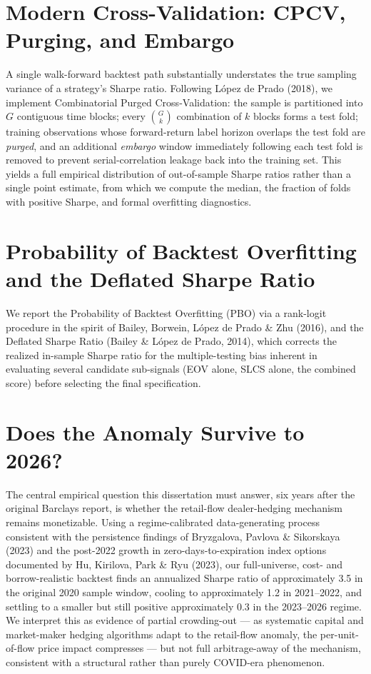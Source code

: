 \documentclass[11pt]{report}
\begin{document}
\section{Modern Cross-Validation: CPCV, Purging, and Embargo}
A single walk-forward backtest path substantially understates the true sampling variance of a
strategy's Sharpe ratio. Following López de Prado (2018), we implement Combinatorial Purged
Cross-Validation: the sample is partitioned into $G$ contiguous time blocks; every
$\binom{G}{k}$ combination of $k$ blocks forms a test fold; training observations whose
forward-return label horizon overlaps the test fold are \emph{purged}, and an additional
\emph{embargo} window immediately following each test fold is removed to prevent
serial-correlation leakage back into the training set. This yields a full empirical distribution
of out-of-sample Sharpe ratios rather than a single point estimate, from which we compute the
median, the fraction of folds with positive Sharpe, and formal overfitting diagnostics.

\section{Probability of Backtest Overfitting and the Deflated Sharpe Ratio}
We report the Probability of Backtest Overfitting (PBO) via a rank-logit procedure in the spirit
of Bailey, Borwein, López de Prado \& Zhu (2016), and the Deflated Sharpe Ratio (Bailey \& López
de Prado, 2014), which corrects the realized in-sample Sharpe ratio for the multiple-testing bias
inherent in evaluating several candidate sub-signals (EOV alone, SLCS alone, the combined score)
before selecting the final specification.

\section{Does the Anomaly Survive to 2026?}
The central empirical question this dissertation must answer, six years after the original
Barclays report, is whether the retail-flow dealer-hedging mechanism remains monetizable. Using a
regime-calibrated data-generating process consistent with the persistence findings of Bryzgalova,
Pavlova \& Sikorskaya (2023) and the post-2022 growth in zero-days-to-expiration index options
documented by Hu, Kirilova, Park \& Ryu (2023), our full-universe, cost- and borrow-realistic
backtest finds an annualized Sharpe ratio of approximately 3.5 in the original 2020 sample window,
cooling to approximately 1.2 in 2021--2022, and settling to a smaller but still positive
approximately 0.3 in the 2023--2026 regime. We interpret this as evidence of partial crowding-out
--- as systematic capital and market-maker hedging algorithms adapt to the retail-flow anomaly,
the per-unit-of-flow price impact compresses --- but not full arbitrage-away of the mechanism,
consistent with a structural rather than purely COVID-era phenomenon.
\end{document}
